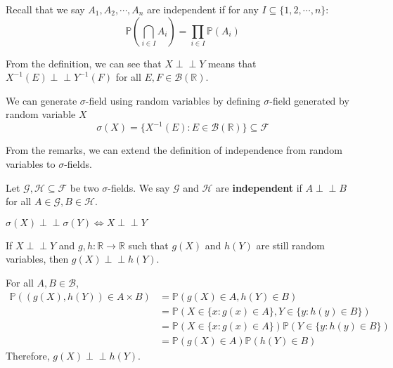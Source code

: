 \documentclass{huhtakm-template-book}
\newcommand{\independent}{\perp\!\!\!\perp}
\newcommand{\prob}{\mathbb{P}}
\begin{document}
    Recall that we say $A_{1},A_{2},\cdots,A_{n}$ are independent if for any $I\subseteq\{1,2,\cdots,n\}$:
    \begin{equation*}
        \prob\left(\bigcap_{i\in I}A_{i}\right)=\prod_{i\in I}\prob(A_{i})
    \end{equation*}
    \begin{rem}
        From the definition, we can see that $X\independent Y$ means that $X^{-1}(E)\independent Y^{-1}(F)$ for all $E,F\in\mathcal{B}(\mathbb{R})$.
    \end{rem}
    \begin{rem}
        We can generate $\sigma$-field using random variables by defining $\sigma$-field generated by random variable $X$
        \begin{equation*}
        	\sigma(X)=\{X^{-1}(E):E\in\mathcal{B}(\mathbb{R})\}\subseteq\mathcal{F}
        \end{equation*}
    \end{rem}
    From the remarks, we can extend the definition of independence from random variables to $\sigma$-fields.
    \begin{defn}
        Let $\mathcal{G},\mathcal{H}\subseteq\mathcal{F}$ be two $\sigma$-fields. We say $\mathcal{G}$ and $\mathcal{H}$ are \textbf{independent} if $A\independent B$ for all $A\in\mathcal{G},B\in\mathcal{H}$.
    \end{defn}
    \begin{rem}
        $\sigma(X)\independent\sigma(Y)\iff X\independent Y$
    \end{rem}
    \begin{thm}
        If $X\independent Y$ and $g,h:\mathbb{R}\to\mathbb{R}$ such that $g(X)$ and $h(Y)$ are still random variables, then $g(X)\independent h(Y)$.
    \end{thm}
    \begin{proofing}
        For all $A,B\in\mathcal{B}$,
        \begin{align*}
            \prob((g(X),h(Y))\in A\times B)&=\prob(g(X)\in A,h(Y)\in B)\\
            &=\prob(X\in\{x:g(x)\in A\},Y\in\{y:h(y)\in B\})\\
            &=\prob(X\in\{x:g(x)\in A\})\prob(Y\in\{y:h(y)\in B\})\\
            &=\prob(g(X)\in A)\prob(h(Y)\in B)
        \end{align*}
        Therefore, $g(X)\independent h(Y)$.
    \end{proofing}
\end{document}
